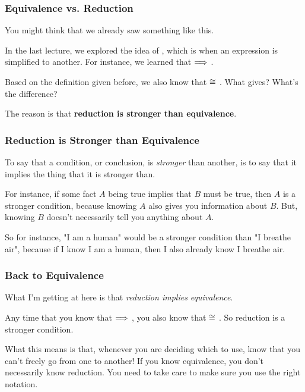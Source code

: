 \documentclass[aspectratio=169]{beamer}
\begin{document}
\begin{frame}[fragile]
  \frametitle{Equivalence vs. Reduction}

  You might think that we already saw something like this.

  \pause
  \vspace{\fill}

  In the last lecture, we explored the idea of , which
  is when an expression is simplified to another. For instance, we learned
  that  $\Longrightarrow$ .

  \pause
  \vspace{\fill}

  Based on the definition given before, we also know that  $\cong$ 
  . What gives? What's the difference?

  \pause
  \vspace{\fill}

  The reason is that \textbf{reduction is stronger than equivalence}.
\end{frame}

\begin{frame}[fragile]
  \frametitle{Reduction is Stronger than Equivalence}

  To say that a condition, or conclusion, is \textit{stronger} than
  another, is to say that it implies the thing that it is stronger than.

  \pause
  \vspace{\fill}

  For instance, if some fact $A$ being true implies that $B$ must be true,
  then $A$ is a stronger condition, because knowing $A$ also gives you
  information about $B$. But, knowing $B$ doesn't necessarily tell you
  anything about $A$.

  \pause
  \vspace{\fill}

  So for instance, "I am a human" would be a stronger condition than
  "I breathe air", because if I know I am a human, then I also already
  know I breathe air.
\end{frame}

\begin{frame}[fragile]
  \frametitle{Back to Equivalence}

  What I'm getting at here is that \textit{reduction implies equivalence}.

  \pause
  \vspace{\fill}

  Any time that you know that  $\Longrightarrow$ , you also
  know that  $\cong$ . So reduction is a stronger
  condition.

  \pause
  \vspace{\fill}

  What this means is that, whenever you are deciding which to use, know
  that you can't freely go from one to another! If you know equivalence,
  you don't necessarily know reduction. You need to take care to make sure
  you use the right notation\footnotemark.

\end{frame}
\end{document}
